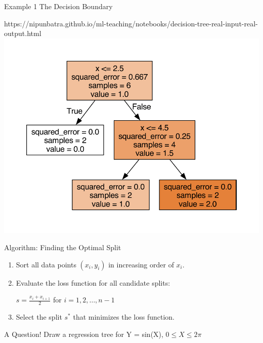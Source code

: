 \documentclass[usenames,dvipsnames]{beamer}
\begin{document}
    \begin{frame}{Example 1}
        The Decision Boundary
        \begin{center}
            \begin{notebookbox}{https://nipunbatra.github.io/ml-teaching/notebooks/decision-tree-real-input-real-output.html}
                \includegraphics[scale=0.6]{../assets/decision-trees/figures/ri-ro-depth-2-sklearn.pdf}
            \end{notebookbox}
        \end{center}
    \end{frame}
	



\begin{frame}{Algorithm: Finding the Optimal Split}
\begin{enumerate}
\item<1-> Sort all data points $(x_i, y_i)$ in increasing order of $x_i$.
\item<2-> Evaluate the loss function for all candidate splits:
\vspace{0.25cm}
\begin{center}
$s = \frac{x_i + x_{i+1}}{2}$ for $i = 1, 2, \ldots, n-1$
\end{center}
\vspace{0.25cm}
\item<2-> Select the split $s^*$ that minimizes the loss function.
\end{enumerate} 
\end{frame}


\begin{frame}{A Question!}
Draw a regression tree for Y = sin(X), $0 \leq X \leq 2\pi$ 
\end{frame}
\end{document}
